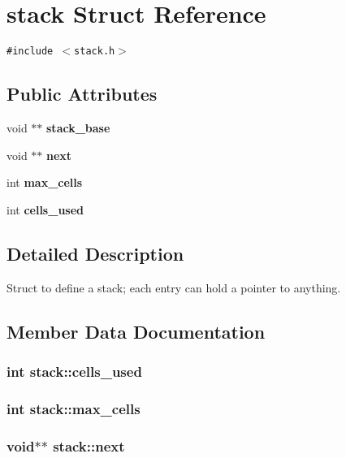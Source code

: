 \section{stack Struct Reference}
\label{structstack}
{\tt \#include $<$stack.h$>$}

\subsection*{Public Attributes}
\begin{CompactItemize}
\item 
void $\ast$$\ast$ \bf{stack\_\-base}
\item 
void $\ast$$\ast$ \bf{next}
\item 
int \bf{max\_\-cells}
\item 
int \bf{cells\_\-used}
\end{CompactItemize}


\subsection{Detailed Description}
Struct to define a stack; each entry can hold a pointer to anything. 



\subsection{Member Data Documentation}
\subsubsection{\setlength{\rightskip}{0pt plus 5cm}int \bf{stack::cells\_\-used}}\label{structstack_28ee7843d36726004dbfdd0d9daba0de}


\subsubsection{\setlength{\rightskip}{0pt plus 5cm}int \bf{stack::max\_\-cells}}\label{structstack_6fe9bf68782a28677fa127cdf59283f9}


\subsubsection{\setlength{\rightskip}{0pt plus 5cm}void$\ast$$\ast$ \bf{stack::next}}\label{structstack_f69204a8101df6010e166d8c19de160f}


